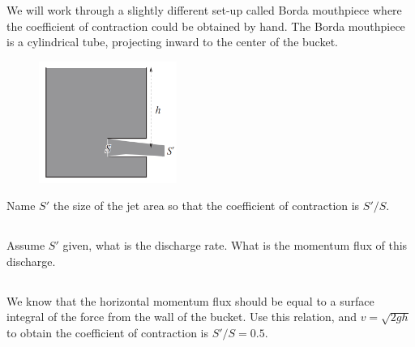 \documentclass[11pt,letterpaper]{article}
\begin{document}
We will work through a slightly different set-up called Borda mouthpiece where the coefficient of contraction could be obtained by hand. The Borda mouthpiece is a cylindrical tube, projecting inward to the center of the bucket.
\begin{figure}[H]
    \centering
    \includegraphics[width=0.4\textwidth]{figs/borda}
\end{figure}
Name $S'$ the size of the jet area so that the coefficient of contraction is $S'/S$. 

\subsection{}
Assume $S'$ given, what is the discharge rate. What is the momentum flux of this discharge.

\subsection{}
We know that the horizontal momentum flux should be equal to a surface integral of the force from the wall of the bucket. Use this relation, and $v=\sqrt{2gh}$ to obtain the coefficient of contraction is $S'/S = 0.5$.

    
\vfill
\printbibliography
\end{document}
